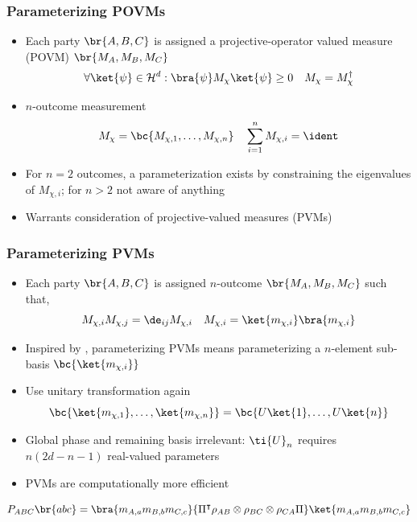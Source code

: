 \documentclass[
    hyperref={bookmarks=false},%
    xcolor={dvipsnames},
]{beamer}
\renewcommand{\term}[1]{\textcolor{Mahogany}{#1}}
\begin{document}
\begin{frame}
    \frametitle{Parameterizing POVMs}
    \begin{itemize}
        \item Each party $\br{A, B, C}$ is assigned a \term{projective-operator valued measure (POVM)} $\br{M_A, M_B, M_C}$
        \[ \forall \ket{\psi} \in \Hilb^d : \bra{\psi} M_\chi \ket{\psi} \geq 0 \quad M_\chi = M_\chi^{\dagger} \]
        \item $n$-outcome measurement
        \[ M_\chi = \bc{M_{\chi, 1}, \ldots, M_{\chi, n}} \quad \sum_{i=1}^{n} M_{\chi, i} = \ident \]
        \item For $n = 2$ outcomes, a parameterization exists by constraining the eigenvalues of $M_{\chi, i}$; for $n > 2$ not aware of anything
        \item Warrants consideration of \term{projective-valued measures (PVMs)}
    \end{itemize}
\end{frame}

\begin{frame}
    \frametitle{Parameterizing PVMs}
    \begin{itemize}
        \item Each party $\br{A, B, C}$ is assigned $n$-outcome $\br{M_A, M_B, M_C}$ such that,
        \[ M_{\chi,i}M_{\chi,j} = \de_{ij} M_{\chi, i} \quad M_{\chi, i} = \ket{m_{\chi,i}}\bra{m_{\chi,i}} \]
        \item Inspired by \cite{Pal_2010}, parameterizing PVMs means parameterizing a $n$-element sub-basis $\bc{\ket{m_{\chi,i}}}$
        \item Use unitary transformation again
        \[ \bc{\ket{m_{\chi,1}}, \ldots, \ket{m_{\chi,n}}} = \bc{U \ket{1}, \ldots, U \ket{n}} \]
        \item Global phase and remaining basis irrelevant: $\ti{U}_{n}$ requires $n(2d - n - 1)$ real-valued parameters\
        \item PVMs are computationally more efficient
    \end{itemize}
    \[ \prob[ABC]\br{abc} = \bra{m_{A,a}m_{B,b}m_{C,c}}{\netperm^\intercal \rho_{AB}\otimes\rho_{BC}\otimes\rho_{CA} \netperm}\ket{m_{A,a}m_{B,b}m_{C,c}} \]
\end{frame}
\end{document}
